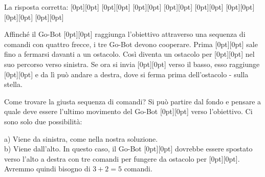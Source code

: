 \documentclass[a4paper,11pt]{report}
\newcommand{\taskGraphicsFolder}{..}
\begin{document}
La risposta corretta:
\raisebox{-0.5ex}[0pt][0pt]{} \raisebox{-0.5ex}[0pt][0pt]{} \raisebox{-0.5ex}[0pt][0pt]{} \raisebox{-0.5ex}[0pt][0pt]{} \raisebox{-0.5ex}[0pt][0pt]{} \raisebox{-0.5ex}[0pt][0pt]{} \raisebox{-0.5ex}[0pt][0pt]{} \raisebox{-0.5ex}[0pt][0pt]{}

Affinché il Go-Bot \raisebox{-0.5ex}[0pt][0pt]{} raggiunga l’obiettivo attraverso una sequenza di comandi con quattro frecce, i tre Go-Bot devono cooperare.
Prima \raisebox{-0.5ex}[0pt][0pt]{} sale fino a fermarsi davanti a un ostacolo.
Così diventa un ostacolo per \raisebox{-0.5ex}[0pt][0pt]{} nel suo percorso verso sinistra.
Se ora si invia \raisebox{-0.5ex}[0pt][0pt]{} verso il basso, esso raggiunge \raisebox{-0.5ex}[0pt][0pt]{} e da lì può andare a destra,
dove si ferma prima dell’ostacolo - sulla stella.

{\centering%
\par}

Come trovare la giusta sequenza di comandi?  Si può partire dal fondo e pensare a quale deve essere l’ultimo movimento del Go-Bot \raisebox{-0.5ex}[0pt][0pt]{} verso l’obiettivo. Ci sono solo due possibilità:

a) Viene da sinistra, come nella nostra soluzione. \\
b) Viene dall’alto. In questo caso, il Go-Bot \raisebox{-0.5ex}[0pt][0pt]{} dovrebbe essere spostato verso l’alto a destra con tre comandi per fungere da ostacolo per \raisebox{-0.5ex}[0pt][0pt]{}. Avremmo quindi bisogno di ${3 + 2 = 5}$ comandi.
\end{document}
